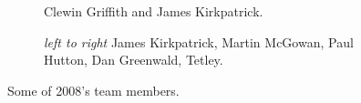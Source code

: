 \begin{figure}
    \begin{subfigure}[t]{0.49\textwidth}
        \centering
        \caption{Clewin Griffith and James Kirkpatrick. } \label{clewin jkp mig}
    \end{subfigure}
    \hfill
    \begin{subfigure}[t]{0.49\textwidth}
        \centering
        \caption{\textit{left to right} James Kirkpatrick, Martin McGowan, Paul Hutton, Dan Greenwald, Tetley. } \label{sunset lounge}
    \end{subfigure}

    \caption{Some of 2008's team members.}
\end{figure}
